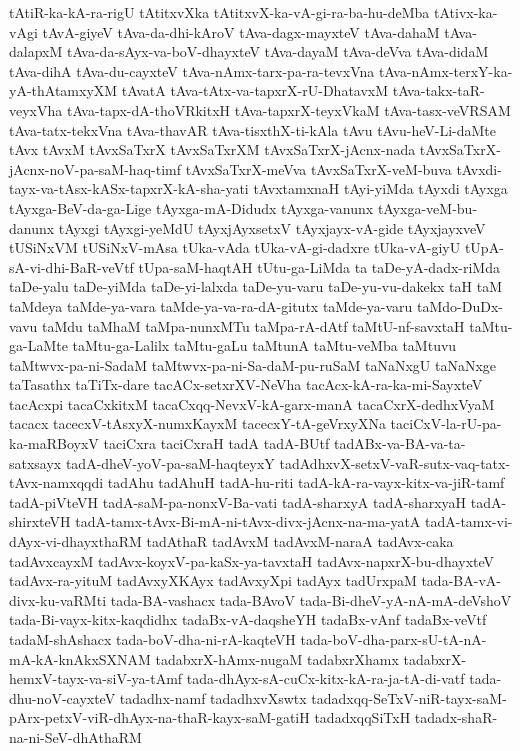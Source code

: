 {tAtiR-ka-kA-ra-rigU
tAtitxvXka
tAtitxvX-ka-vA-gi-ra-ba-hu-deMba
tAtivx-ka-vAgi
tAvA-giyeV
tAva-da-dhi-kAroV
tAva-dagx-mayxteV
tAva-dahaM
tAva-dalapxM
tAva-da-sAyx-va-boV-dhayxteV
tAva-dayaM
tAva-deVva
tAva-didaM
tAva-dihA
tAva-du-cayxteV
tAva-nAmx-tarx-pa-ra-tevxVna
tAva-nAmx-terxY-ka-yA-thAtamxyXM
tAvatA
tAva-tAtx-va-tapxrX-rU-DhatavxM
tAva-takx-taR-veyxVha
tAva-tapx-dA-thoVRkitxH
tAva-tapxrX-teyxVkaM
tAva-tasx-veVRSAM
tAva-tatx-tekxVna
tAva-thavAR
tAva-tisxthX-ti-kAla
tAvu
tAvu-heV-Li-daMte
tAvx
tAvxM
tAvxSaTxrX
tAvxSaTxrXM
tAvxSaTxrX-jAcnx-nada
tAvxSaTxrX-jAcnx-noV-pa-saM-haq-timf
tAvxSaTxrX-meVva
tAvxSaTxrX-veM-buva
tAvxdi-tayx-va-tAsx-kASx-tapxrX-kA-sha-yati
tAvxtamxnaH
tAyi-yiMda
tAyxdi
tAyxga
tAyxga-BeV-da-ga-Lige
tAyxga-mA-Didudx
tAyxga-vanunx
tAyxga-veM-bu-danunx
tAyxgi
tAyxgi-yeMdU
tAyxjAyxsetxV
tAyxjayx-vA-gide
tAyxjayxveV
tUSiNxVM
tUSiNxV-mAsa
tUka-vAda
tUka-vA-gi-dadxre
tUka-vA-giyU
tUpA-sA-vi-dhi-BaR-veVtf
tUpa-saM-haqtAH
tUtu-ga-LiMda
ta
taDe-yA-dadx-riMda
taDe-yalu
taDe-yiMda
taDe-yi-lalxda
taDe-yu-varu
taDe-yu-vu-dakekx
taH
taM
taMdeya
taMde-ya-vara
taMde-ya-va-ra-dA-gitutx
taMde-ya-varu
taMdo-DuDx-vavu
taMdu
taMhaM
taMpa-nunxMTu
taMpa-rA-dAtf
taMtU-nf-savxtaH
taMtu-ga-LaMte
taMtu-ga-Lalilx
taMtu-gaLu
taMtunA
taMtu-veMba
taMtuvu
taMtwvx-pa-ni-SadaM
taMtwvx-pa-ni-Sa-daM-pu-ruSaM
taNaNxgU
taNaNxge
taTasathx
taTiTx-dare
tacACx-setxrXV-NeVha
tacAcx-kA-ra-ka-mi-SayxteV
tacAcxpi
tacaCxkitxM
tacaCxqq-NevxV-kA-garx-manA
tacaCxrX-dedhxVyaM
tacacx
tacecxV-tAsxyX-numxKayxM
tacecxY-tA-geVrxyXNa
taciCxV-la-rU-pa-ka-maRBoyxV
taciCxra
taciCxraH
tadA
tadA-BUtf
tadABx-va-BA-va-ta-satxsayx
tadA-dheV-yoV-pa-saM-haqteyxY
tadAdhxvX-setxV-vaR-sutx-vaq-tatx-tAvx-namxqqdi
tadAhu
tadAhuH
tadA-hu-riti
tadA-kA-ra-vayx-kitx-va-jiR-tamf
tadA-piVteVH
tadA-saM-pa-nonxV-Ba-vati
tadA-sharxyA
tadA-sharxyaH
tadA-shirxteVH
tadA-tamx-tAvx-Bi-mA-ni-tAvx-divx-jAcnx-na-ma-yatA
tadA-tamx-vi-dAyx-vi-dhayxthaRM
tadAthaR
tadAvxM
tadAvxM-naraA
tadAvx-caka
tadAvxcayxM
tadAvx-koyxV-pa-kaSx-ya-tavxtaH
tadAvx-napxrX-bu-dhayxteV
tadAvx-ra-yituM
tadAvxyXKAyx
tadAvxyXpi
tadAyx
tadUrxpaM
tada-BA-vA-divx-ku-vaRMti
tada-BA-vashacx
tada-BAvoV
tada-Bi-dheV-yA-nA-mA-deVshoV
tada-Bi-vayx-kitx-kaqdidhx
tadaBx-vA-daqsheYH
tadaBx-vAnf
tadaBx-veVtf
tadaM-shAshacx
tada-boV-dha-ni-rA-kaqteVH
tada-boV-dha-parx-sU-tA-nA-mA-kA-knAkxSXNAM
tadabxrX-hAmx-nugaM
tadabxrXhamx
tadabxrX-hemxV-tayx-va-siV-ya-tAmf
tada-dhAyx-sA-cuCx-kitx-kA-ra-ja-tA-di-vatf
tada-dhu-noV-cayxteV
tadadhx-namf
tadadhxvXswtx
tadadxqq-SeTxV-niR-tayx-saM-pArx-petxV-viR-dhAyx-na-thaR-kayx-saM-gatiH
tadadxqqSiTxH
tadadx-shaR-na-ni-SeV-dhAthaRM
}
